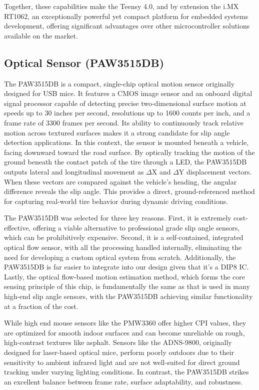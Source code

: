 \documentclass[12pt]{article}
\begin{document}
            Together, these capabilities make the Teensy 4.0, and by extension the i.MX RT1062, an exceptionally powerful yet compact platform for embedded 
            systems development, offering significant advantages over other microcontroller solutions available on the market.

        \subsection{Optical Sensor (PAW3515DB)}
            
            The PAW3515DB is a compact, single-chip optical motion sensor originally designed for USB mice. It features a CMOS image sensor and an onboard digital 
            signal processor capable of detecting precise two-dimensional surface motion at speeds up to 30 inches per second, resolutions up to 1600 counts per inch, 
            and a frame rate of 3300 frames per second. Its ability to continuously track relative motion across textured surfaces makes it a strong candidate for 
            slip angle detection applications. In this context, the sensor is mounted beneath a vehicle, facing downward toward the road surface. By optically 
            tracking the motion of the ground beneath the contact patch of the tire through a LED, the PAW3515DB outputs lateral and longitudinal movement as 
            $\Delta$X and $\Delta$Y displacement vectors. When these vectors are compared against the vehicle's heading, the angular difference reveals the slip angle. 
            This provides a direct, ground-referenced method for capturing real-world tire behavior during dynamic driving conditions.

            The PAW3515DB was selected for three key reasons. First, it is extremely cost-effective, offering a viable alternative to professional grade slip 
            angle sensors, which can be prohibitively expensive. Second, it is a self-contained, integrated optical flow sensor, with all the processing handled 
            internally, eliminating the need for developing a custom optical system from scratch. Additionally, the PAW3515DB is far easier to integrate into our 
            design given that it's a DIP8 IC. Lastly, the optical flow-based motion estimation method, which forms the core sensing principle of this chip, is 
            fundamentally the same as that is used in many high-end slip angle sensors, with the PAW3515DB achieving similar functionality at a fraction of the cost.

            While high end mouse sensors like the PMW3360 offer higher CPI values, they are optimized for smooth indoor surfaces and can become unreliable on rough, 
            high-contrast textures like asphalt. Sensors like the ADNS-9800, originally designed for laser-based optical mice, perform poorly outdoors due to their 
            sensitivity to ambient infrared light and are not well-suited for direct ground tracking under varying lighting conditions. In contrast, the PAW3515DB 
            strikes an excellent balance between frame rate, surface adaptability, and robustness.
\end{document}
